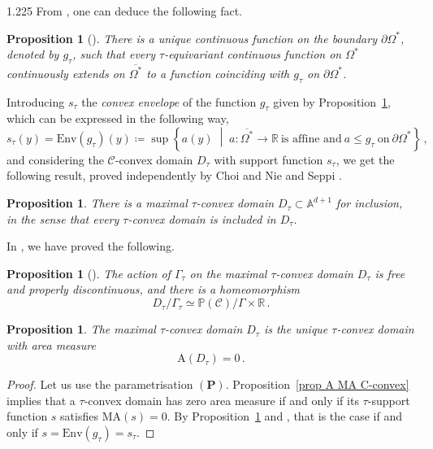 \documentclass[reqno, a4paper]{amsart}
\numberwithin{equation}{section}
\numberwithin{figure}{section}
\newtheorem{proposition}[theorem]{Proposition}
\theoremstyle{definition}
\theoremstyle{remark}
\newcommand{\R}{\mathbb{R}} %
\newcommand{\A}{\mathbb{A}} %
\renewcommand{\P}{\mathbb{P}} %
\newcommand{\C}{\mathcal{C}} %
\newcommand{\Area}{\mathrm{A}} %
\newcommand{\MA}{\mathrm{MA}} %
\newcommand{\st}{\; \middle\vert \;} %
\begin{document}
\begin{spacing}{1.225}
From \cite{Nie_Seppi_22}, one can deduce the following fact.

\begin{proposition}[{\cite[Proposition~5.12]{Ablondi_25}}]
\label{prop existence of boundary function gtau}
There is a unique continuous function on the boundary $\partial \Omega^*$, denoted by $g_\tau$, such that every $\tau$-equivariant continuous function on $\Omega^*$ continuously extends on $\overline{\Omega^*}$ to a function coinciding with $g_\tau$ on $\partial \Omega^*$.
\end{proposition}


Introducing $s_\tau$ the \emph{convex envelope} of the function $g_\tau$ given by Proposition~\ref{prop existence of boundary function gtau}, which can be expressed in the following way,
\begin{equation*}
s_\tau (y) = \mathrm{Env}(g_\tau)(y) \coloneqq \sup \left\lbrace a(y) \st a : \overline{\Omega^*} \to \R \ \text{is affine and} \ a\leq g_\tau \ \text{on} \ \partial \Omega^*\right\rbrace \, ,
\end{equation*}
and considering the $\C$-convex domain $D_\tau $ with support function $s_\tau$, we get the following result, proved independently by Choi \cite{Choi_25} and Nie and Seppi \cite{Nie_Seppi_23}. 

\begin{proposition}
\label{prop Dtau}
There is a \emph{maximal $\tau$-convex domain} $D_\tau \subset \A^{d+1}$ for inclusion, in the sense that every $\tau$-convex domain is included in $D_\tau$.
\end{proposition}

In \cite{Ablondi_25}, we have proved the following.

\begin{proposition}[{\cite[Theorem 7.8]{Ablondi_25}}]
\label{prop action Dtau free prop disc}
The action of $\Gamma_\tau$ on the maximal $\tau$-convex domain $D_\tau$ is free and properly discontinuous, and there is a homeomorphism
\begin{equation*}
D_\tau /\Gamma_\tau \simeq \P(\C)/\Gamma \times \R \, .
\end{equation*}  
\end{proposition}

\begin{proposition}
The maximal $\tau$-convex domain $D_\tau$ is the unique $\tau$-convex domain with area measure 
\begin{equation*}
 \Area(D_\tau) = 0 \, . 
\end{equation*}
\end{proposition}
\begin{proof}
Let us use the parametrisation $(\mathbf{P})$. Proposition~\ref{prop A MA C-convex} implies that a $\tau$-convex domain has zero area measure if and only if its $\tau$-support function $s$ satisfies $\MA(s) =0 $. By Proposition~\ref{prop existence of boundary function gtau} and  \cite[1.5.2]{Gutierrez_01}, that is the case if and only if $s = \mathrm{Env}(g_\tau)=s_\tau$. 
\end{proof}



\end{spacing}
\end{document}
